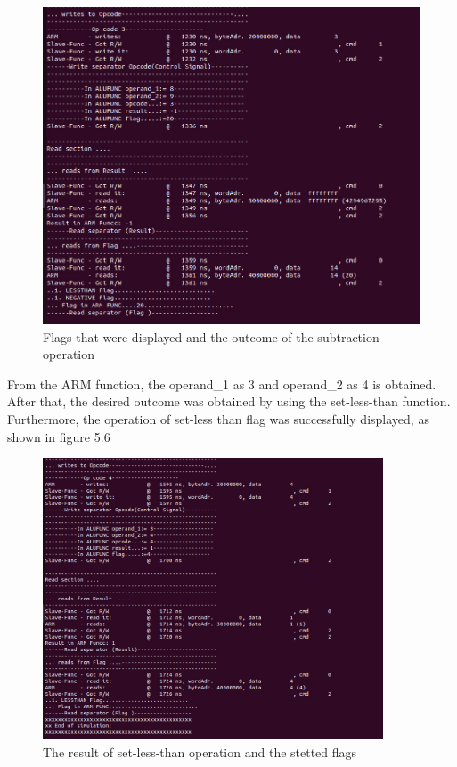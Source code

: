\documentclass[a4paper,12pt,english]{report}
\begin{document}
\begin{enumerate}
\begin{figure}[ht]
	\includegraphics[width=1\textwidth]{SUB} %
	\caption{Flags that were displayed and the outcome of the subtraction operation}
	\label{ref: sub}
\end{figure}
\newpage
From the ARM function,  the operand\_1 as 3 and operand\_2 as 4 is obtained. After that, the desired outcome was obtained by using the set-less-than function. Furthermore, the operation of set-less than flag was successfully displayed, as shown in figure 5.6\\
\begin{figure}[ht]
	\centering
	\includegraphics[width=0.9\textwidth]{lessthan} %
	\caption{The result of set-less-than operation and the stetted flags}
	\label{}
\end{figure}


\end{enumerate}
\end{document}
